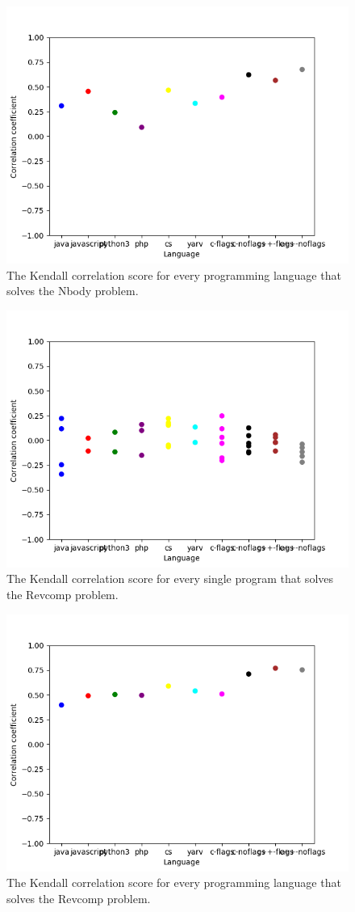 \begin{appendices}
\begin{figure}[h]
    \centering
    \includegraphics[width=.6\textwidth]{graphs/kendall-lang_Nbody.png}
    \caption{The Kendall correlation score for every programming language that solves the Nbody problem.}
    \label{fig:corr-lang-nbody}
\end{figure}

\begin{figure}[h]
    \centering
    \includegraphics[width=.6\textwidth]{graphs/kendall_Revcomp.png}
    \caption{The Kendall correlation score for every single program that solves the Revcomp problem.}
    \label{fig:corr-revcomp}
\end{figure}

\begin{figure}[h]
    \centering
    \includegraphics[width=.6\textwidth]{graphs/kendall-lang_Revcomp.png}
    \caption{The Kendall correlation score for every programming language that solves the Revcomp problem.}
    \label{fig:corr-lang-revcomp}
\end{figure}


\end{appendices}
